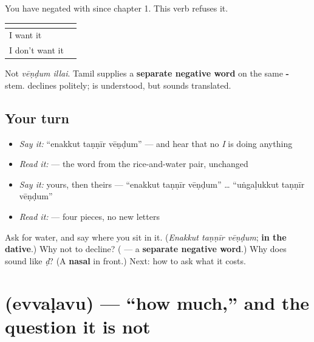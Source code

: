 \begin{grammarlens}[title={Grammar Lens: the negative comes from somewhere else}]
You have negated with \textbf{} since chapter 1. This verb refuses it.

\noindent
\begin{tabularx}{\linewidth}{@{}>{\raggedright\arraybackslash}X>{\raggedright\arraybackslash}X@{}}
\toprule
\textbf{} & \textbf{} \\
\midrule
I want it & \textbf{\ta{வேண்டும்}} \\
I don't want it & \textbf{\ta{வேண்டாம்}} \\
\bottomrule
\end{tabularx}

Not \emph{vēṇḍum illai}. Tamil supplies a \textbf{separate negative word} on the same \textbf{-} stem. \textbf{} declines politely; \textbf{} is understood, but sounds translated.
\end{grammarlens}

\subsection*{Your turn}
\begin{itemize}
\raggedright
  \item \emph{Say it:} \textquotedblleft{}enakkut taṇṇīr vēṇḍum\textquotedblright{} — and hear that no \emph{I} is doing anything
  \item \emph{Read it:} \textbf{} — the word from the rice-and-water pair, unchanged
  \item \emph{Say it:} yours, then theirs — \textquotedblleft{}enakkut taṇṇīr vēṇḍum\textquotedblright{} … \textquotedblleft{}uṅgaḷukkut taṇṇīr vēṇḍum\textquotedblright{}
  \item \emph{Read it:} \textbf{} — four pieces, no new letters
\end{itemize}

\begin{tcolorbox}[breakable,colback=teal!4,colframe=teal!35!black,title={Before you move on}]
Ask for water, and say where you sit in it. (\emph{Enakkut taṇṇīr vēṇḍum}; \textbf{in the dative}.) Why not \textbf{} to decline? (\textbf{} — a \textbf{separate negative word}.) Why does \textbf{} sound like \emph{ḍ}? (A \textbf{nasal} in front.) Next: how to ask what it costs.
\end{tcolorbox}
\section[\texorpdfstring{\ta{எவ்வளவு} (evvaḷavu)}{எவ்வளவு (evvaḷavu)}]{ (evvaḷavu) — \textquotedblleft{}how much,\textquotedblright{} and the question it is not}

